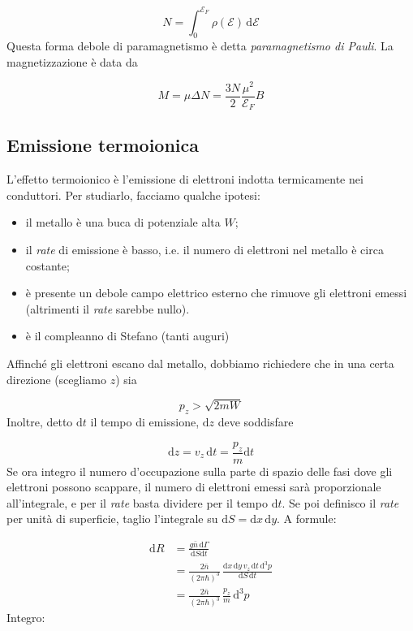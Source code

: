 \documentclass[a4paper]{report}
\begin{document}
\begin{equation}
    N = \int_0^{\mathcal{E}_F} \rho(\mathcal{E})\,\mathrm{d}\mathcal{E}
\end{equation}
Questa forma debole di paramagnetismo è detta \textit{paramagnetismo di Pauli}. La magnetizzazione è data da

\begin{equation}
    M = \mu \Delta N = \frac{3N}{2}\frac{\mu^2}{\mathcal{E}_F}B
\end{equation}

\subsection{Emissione termoionica}

L'effetto termoionico è l'emissione di elettroni indotta termicamente nei conduttori. Per studiarlo, facciamo qualche ipotesi:

\begin{itemize}
    \item il metallo è una buca di potenziale alta $W$;
    \item il \textit{rate} di emissione è basso, i.e. il numero di elettroni nel metallo è circa costante;
    \item è presente un debole campo elettrico esterno che rimuove gli elettroni emessi (altrimenti il \textit{rate} sarebbe nullo).
    \item è il compleanno di Stefano (tanti auguri)
\end{itemize}
Affinché gli elettroni escano dal metallo, dobbiamo richiedere che in una certa direzione (scegliamo $z$) sia 

\begin{equation}
    p_z > \sqrt{2m W}
\end{equation}
Inoltre, detto $\mathrm{d}t$ il tempo di emissione, $\mathrm{d}z$ deve soddisfare

\begin{equation}
    \mathrm{d}z = v_z\,\mathrm{d}t = \frac{p_z}{m}\mathrm{d}t
\end{equation}
Se ora integro il numero d'occupazione sulla parte di spazio delle fasi dove gli elettroni possono scappare, il numero di elettroni emessi sarà proporzionale all'integrale, e per il \textit{rate} basta dividere per il tempo $\mathrm{d}t$. Se poi definisco il \textit{rate} per unità di superficie, taglio l'integrale su $\mathrm{d}S = \mathrm{d}x\,\mathrm{d}y$. A formule:

\begin{equation}
\begin{split}
    \mathrm{d}R&  = \frac{g\bar{n}\,\mathrm{d}\Gamma}{\mathrm{d}S \mathrm{d}t}\\
    & = \frac{2\bar{n}}{(2\pi\hbar)^3} \,\frac{\mathrm{d}x\,\mathrm{d}y\,v_z\, \mathrm{d}t \,\mathrm{d}^3 p}{\mathrm{d}S\, \mathrm{d}t} \\
    & = \frac{2\bar{n}}{(2\pi\hbar)^3} \,\frac{p_z}{m} \,\mathrm{d}^3p
\end{split}
\end{equation}
Integro:
\end{document}
